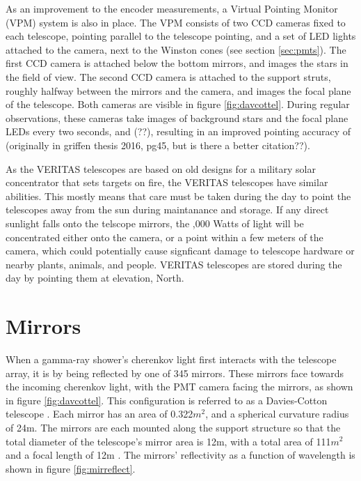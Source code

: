 As an improvement to the encoder measurements, a Virtual Pointing Monitor (VPM) system is also in place.
The VPM consists of two CCD cameras fixed to each telescope, pointing parallel to the telescope pointing, and a set of LED lights attached to the camera, next to the Winston cones (see section \ref{sec:pmts}).
The first CCD camera is attached below the bottom mirrors, and images the stars in the field of view.
The second CCD camera is attached to the support struts, roughly halfway between the mirrors and the camera, and images the focal plane of the telescope.
Both cameras are visible in figure \ref{fig:davcottel}.
During regular observations, these cameras take images of background stars and the focal plane LEDs every two seconds, and (??), resulting in an improved pointing accuracy of \degree (originally in griffen thesis 2016, pg45, but is there a better citation??).

As the VERITAS telescopes are based on old designs for a military solar concentrator that sets targets on fire\cite{daviescotton}, the VERITAS telescopes have similar abilities.
This mostly means that care must be taken during the day to point the telescopes away from the sun during maintanance and storage.
If any direct sunlight falls onto the telscope mirrors, the ,000 Watts of light will be concentrated either onto the camera, or a point within a few meters of the camera, which could potentially cause signficant damage to telescope hardware or nearby plants, animals, and people.
VERITAS telescopes are stored during the day by pointing them at \degree elevation, North.


\section{Mirrors}\label{sec:mirrors}

When a gamma-ray shower's cherenkov light first interacts with the telescope array, it is by being reflected by one of 345 mirrors.
These mirrors face towards the incoming cherenkov light, with the PMT camera facing the mirrors, as shown in figure \ref{fig:davcottel}.
This configuration is referred to as a Davies-Cotton telescope \cite{daviescotton}.
Each mirror has an area of 0.322$m^2$, and a spherical curvature radius of 24m.
The mirrors are each mounted along the support structure so that the total diameter of the telescope's mirror area is 12m, with a total area of 111$m^2$ and a focal length of 12m \cite{Veritas_Detector}.
The mirrors' reflectivity as a function of wavelength is shown in figure \ref{fig:mirreflect}.

